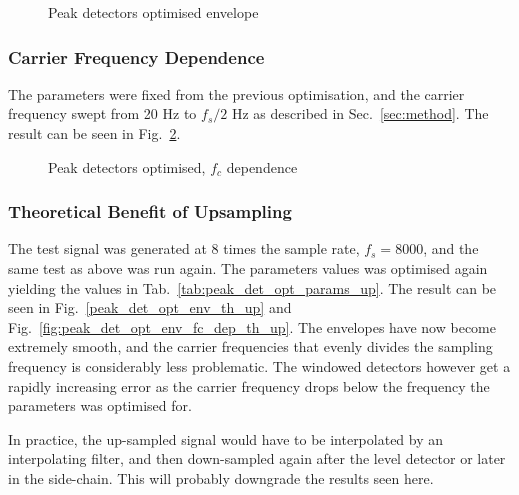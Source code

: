 \documentclass[../main2.tex]{subfiles}
\providecommand{\rootdir}{..}
\begin{document}
\begin{figure}[h]
\centerline{}
\caption{Peak detectors optimised envelope}
\label{fig:peak_det_opt_env}
\end{figure}

\subsubsection{Carrier Frequency Dependence}
The parameters were fixed from the previous optimisation, and the carrier frequency swept from 20 Hz to $f_s/2$ Hz as described in Sec.~\ref{sec:method}. The result can be seen in Fig.~\ref{fig:peak_det_opt_env_fc_dep}.

\begin{figure}[h]
\centerline{}
\caption{Peak detectors optimised, $f_c$ dependence}
\label{fig:peak_det_opt_env_fc_dep}
\end{figure}

\FloatBarrier
\subsubsection{Theoretical Benefit of Upsampling}
The test signal was generated at 8 times the sample rate, $f_s = 8000$, and the same test as above was run again. The parameters values was optimised again yielding the values in Tab.~\ref{tab:peak_det_opt_params_up}. The result can be seen in Fig.~\ref{peak_det_opt_env_th_up} and Fig.~\ref{fig:peak_det_opt_env_fc_dep_th_up}.
The envelopes have now become extremely smooth, and the carrier frequencies that evenly divides the sampling frequency is considerably less problematic. The windowed detectors however get a rapidly increasing error as the carrier frequency drops below the frequency the parameters was optimised for.

In practice, the up-sampled signal would have to be interpolated by an interpolating filter, and then down-sampled again after the level detector or later in the side-chain. This will probably downgrade the results seen here.
\end{document}
